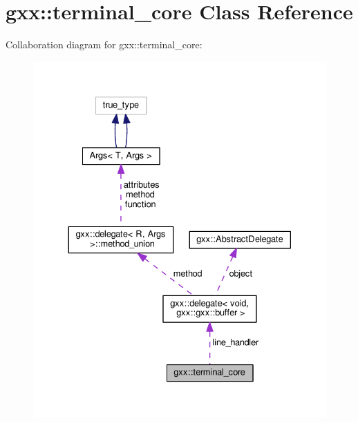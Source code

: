 \hypertarget{classgxx_1_1terminal__core}{}\section{gxx\+:\+:terminal\+\_\+core Class Reference}
\label{classgxx_1_1terminal__core}


Collaboration diagram for gxx\+:\+:terminal\+\_\+core\+:
\nopagebreak
\begin{figure}[H]
\begin{center}
\leavevmode
\includegraphics[width=330pt]{classgxx_1_1terminal__core__coll__graph}
\end{center}
\end{figure}
